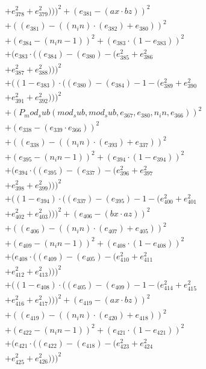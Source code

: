 \documentclass[10pt, a4paper]{article}
\begin{document}
\begin{small}
\begin{align*}
& + e_{378}^{2} + e_{379}^{2})))^{2} + (e_{381} - (ax  \cdot  bz))^{2} \\
& + ((e_{381}) - ((n_in)  \cdot  (e_{382}) + e_{380}))^{2} \\
& + (e_{384} - (n_in - 1))^{2} + (e_{383}  \cdot  (1 - e_{383}))^{2} \\
& + (e_{383}  \cdot  ((e_{384}) - (e_{380}) - (e_{385}^{2} + e_{386}^{2} \\
& + e_{387}^{2} + e_{388}^{2})))^{2} \\
& + ((1 - e_{383})  \cdot  ((e_{380}) - (e_{384}) - 1 - (e_{389}^{2} + e_{390}^{2} \\
& + e_{391}^{2} + e_{392}^{2})))^{2} \\
& + (P_mod_sub(mod_sub, mod_sub, e_{367}, e_{380}, n_in, e_{366}))^{2} \\
& + (e_{338} - (e_{339}  \cdot  e_{366}))^{2} \\
& + ((e_{338}) - ((n_in)  \cdot  (e_{393}) + e_{337}))^{2} \\
& + (e_{395} - (n_in - 1))^{2} + (e_{394}  \cdot  (1 - e_{394}))^{2} \\
& + (e_{394}  \cdot  ((e_{395}) - (e_{337}) - (e_{396}^{2} + e_{397}^{2} \\
& + e_{398}^{2} + e_{399}^{2})))^{2} \\
& + ((1 - e_{394})  \cdot  ((e_{337}) - (e_{395}) - 1 - (e_{400}^{2} + e_{401}^{2} \\
& + e_{402}^{2} + e_{403}^{2})))^{2} + (e_{406} - (bx  \cdot  az))^{2} \\
& + ((e_{406}) - ((n_in)  \cdot  (e_{407}) + e_{405}))^{2} \\
& + (e_{409} - (n_in - 1))^{2} + (e_{408}  \cdot  (1 - e_{408}))^{2} \\
& + (e_{408}  \cdot  ((e_{409}) - (e_{405}) - (e_{410}^{2} + e_{411}^{2} \\
& + e_{412}^{2} + e_{413}^{2})))^{2} \\
& + ((1 - e_{408})  \cdot  ((e_{405}) - (e_{409}) - 1 - (e_{414}^{2} + e_{415}^{2} \\
& + e_{416}^{2} + e_{417}^{2})))^{2} + (e_{419} - (ax  \cdot  bz))^{2} \\
& + ((e_{419}) - ((n_in)  \cdot  (e_{420}) + e_{418}))^{2} \\
& + (e_{422} - (n_in - 1))^{2} + (e_{421}  \cdot  (1 - e_{421}))^{2} \\
& + (e_{421}  \cdot  ((e_{422}) - (e_{418}) - (e_{423}^{2} + e_{424}^{2} \\
& + e_{425}^{2} + e_{426}^{2})))^{2} \\

\end{align*}
\end{small}
\end{document}
